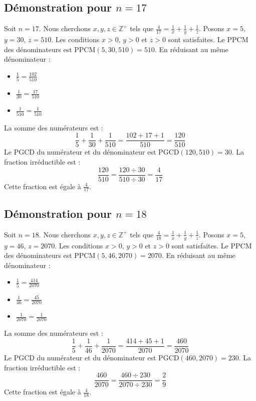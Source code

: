 \documentclass[11pt,a4paper]{article}
\begin{document}
\subsection{Démonstration pour $n = 17$}
Soit $n = 17$. Nous cherchons $x, y, z \in \mathbb{Z}^{+}$ tels que $\frac{4}{17} = \frac{1}{x} + \frac{1}{y} + \frac{1}{z}$.
Posons $x = 5$, $y = 30$, $z = 510$.
Les conditions $x > 0$, $y > 0$ et $z > 0$ sont satisfaites.
Le PPCM des dénominateurs est $\text{PPCM}(5, 30, 510) = 510$.
En réduisant au même dénominateur :
\begin{itemize}
    \item $\frac{1}{5} = \frac{102}{510}$
    \item $\frac{1}{30} = \frac{17}{510}$
    \item $\frac{1}{510} = \frac{1}{510}$
\end{itemize}
La somme des numérateurs est :
$$ \frac{1}{5} + \frac{1}{30} + \frac{1}{510} = \frac{102 + 17 + 1}{510} = \frac{120}{510} $$
Le PGCD du numérateur et du dénominateur est $\text{PGCD}(120, 510) = 30$.
La fraction irréductible est :
$$ \frac{120}{510} = \frac{120 \div 30}{510 \div 30} = \frac{4}{17} $$
Cette fraction est égale à $\frac{4}{17}$.

\subsection{Démonstration pour $n = 18$}
Soit $n = 18$. Nous cherchons $x, y, z \in \mathbb{Z}^{+}$ tels que $\frac{4}{18} = \frac{1}{x} + \frac{1}{y} + \frac{1}{z}$.
Posons $x = 5$, $y = 46$, $z = 2070$.
Les conditions $x > 0$, $y > 0$ et $z > 0$ sont satisfaites.
Le PPCM des dénominateurs est $\text{PPCM}(5, 46, 2070) = 2070$.
En réduisant au même dénominateur :
\begin{itemize}
    \item $\frac{1}{5} = \frac{414}{2070}$
    \item $\frac{1}{46} = \frac{45}{2070}$
    \item $\frac{1}{2070} = \frac{1}{2070}$
\end{itemize}
La somme des numérateurs est :
$$ \frac{1}{5} + \frac{1}{46} + \frac{1}{2070} = \frac{414 + 45 + 1}{2070} = \frac{460}{2070} $$
Le PGCD du numérateur et du dénominateur est $\text{PGCD}(460, 2070) = 230$.
La fraction irréductible est :
$$ \frac{460}{2070} = \frac{460 \div 230}{2070 \div 230} = \frac{2}{9} $$
Cette fraction est égale à $\frac{4}{18}$.
\end{document}
